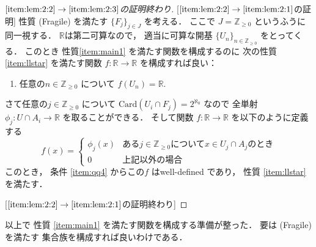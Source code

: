 \documentclass[leqno, a4paper, 12pt]{jsarticle}
\theoremstyle{definition}
\newcommand{\zz}{\mathbb{Z}}
\newcommand{\rr}{\mathbb{R}}
\newcommand{\card}{\mathrm{Card}}
\newcommand{\myco}{2^{\aleph_{0}}}
\newcommand{\myhh}{($\heartsuit$)}
\newcommand{\mysq}{\textup{(Fragile)}}
\begin{document}
\begin{proof}
[$\ref{item:lem:2:2}\to \ref{item:lem:2:3}$の証明終わり]

[$\ref{item:lem:2:2}\to \ref{item:lem:2:1}$の証明]
性質
\mysq
を満たす
$\{F_{j}\}_{j\in J}$
を考える．
ここで
$J=\zz_{\ge 0}$
というふうに同一視する．
$\rr$は第二可算なので，
適当に可算な開基
$\{U_{n}\}_{n\in \zz_{\ge 0}}$
をとってくる．
このとき
性質\ref{item:main1}
を満たす関数を構成するのに
次の性質
\ref{item:llstar}
を満たす関数
$f\colon \rr\to \rr$
を構成すれば良い：
\begin{enumerate}[label=\textup{\myhh}]
\item\label{item:llstar}
任意の$n\in \zz_{\ge 0}$
について
$f(U_{n})=\rr$. 
\end{enumerate}
さて任意の$j\in \zz_{\ge 0}$
について
$\card(U_{i}\cap F_{j})=\myco$
なので
全単射
$\phi_{j}\colon U\cap A_{i}\to \rr$
を取ることができる．
そして関数
$f\colon \rr\to \rr$
を以下のように定義する
\[
f(x)
=\begin{cases}
\phi_{j}(x) & \text{ある$j\in \zz_{\ge 0}$について$x\in U_{j}\cap A_{j}$のとき}\\
0 & \text{上記以外の場合}
\end{cases}
\]
このとき，
条件
\ref{item:qq4}
からこの$f$
はwell-defined
であり，
性質
\ref{item:llstar}
を満たす．

[$\ref{item:lem:2:2}\to \ref{item:lem:2:1}$の証明終わり]
\end{proof}

以上で
性質
\ref{item:main1}
を満たす関数を構成する準備が整った．
要は
\mysq
を満たす
集合族を構成すれば良いわけである．
\end{document}
